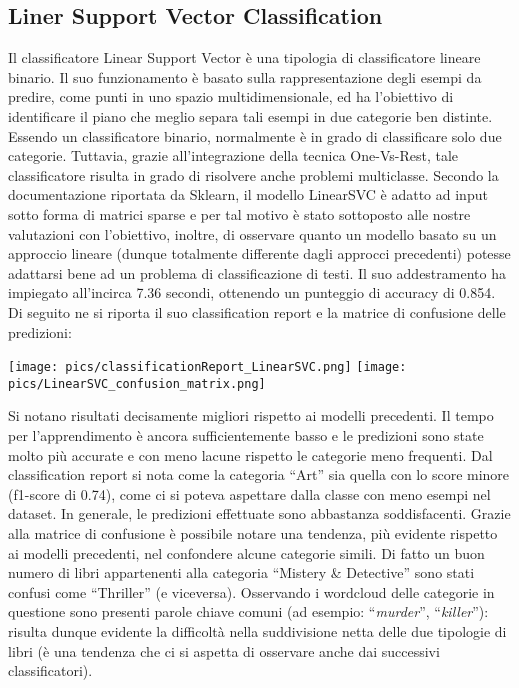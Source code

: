 \documentclass[12pt,oneside]{article}
\begin{document}
    \newpage
    \begin{enumerate}
    \subsection{Liner Support Vector Classification}
    \begin{justify}
        Il classificatore Linear Support Vector è una tipologia di classificatore lineare binario. Il suo funzionamento è basato sulla rappresentazione degli esempi da predire, come punti in uno spazio multidimensionale, ed ha l’obiettivo di identificare il piano che meglio separa tali esempi in due categorie ben distinte. Essendo un classificatore binario, normalmente è in grado di classificare solo due categorie. Tuttavia, grazie all’integrazione della tecnica One-Vs-Rest, tale classificatore risulta in grado di risolvere anche problemi multiclasse. 
        Secondo la documentazione riportata da Sklearn, il modello LinearSVC è adatto ad input sotto forma di matrici sparse e per tal motivo è stato sottoposto alle nostre valutazioni con l’obiettivo, inoltre, di osservare quanto un modello basato su un approccio lineare (dunque totalmente differente dagli approcci precedenti) potesse adattarsi bene ad un problema di classificazione di testi.
        Il suo addestramento ha impiegato all’incirca 7.36 secondi, ottenendo un punteggio di accuracy di 0.854. 
        Di seguito ne si riporta il suo classification report e la matrice di confusione delle predizioni:
        \end{justify}

        \centering
        \texttt{[image: pics/classificationReport\_LinearSVC.png]}
        \texttt{[image: pics/LinearSVC\_confusion\_matrix.png]}

        
        \begin{justify}
        Si notano risultati decisamente migliori rispetto ai modelli precedenti. Il tempo per l’apprendimento è ancora sufficientemente basso e le predizioni sono state molto più accurate e con meno lacune rispetto le categorie meno frequenti. Dal classification report si nota come la categoria “Art” sia quella con lo score minore (f1-score di 0.74), come ci si poteva aspettare dalla classe con meno esempi nel dataset. In generale, le predizioni effettuate sono abbastanza soddisfacenti. Grazie alla matrice di confusione è possibile notare una tendenza, più evidente rispetto ai modelli precedenti, nel confondere alcune categorie simili. Di fatto un buon numero di libri appartenenti alla categoria “Mistery \& Detective” sono stati confusi come “Thriller” (e viceversa). Osservando i wordcloud delle categorie in questione sono presenti parole chiave comuni (ad esempio: “\textit{murder}”, “\textit{killer}”): risulta dunque evidente la difficoltà nella suddivisione netta delle due tipologie di libri (è una tendenza che ci si aspetta di osservare anche dai successivi classificatori).
    \end{justify}
    \end{enumerate}
\end{document}
